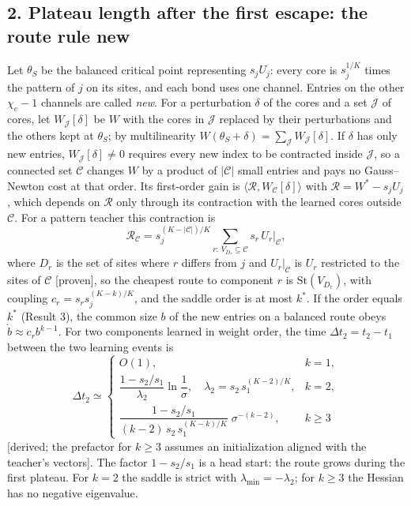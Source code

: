\documentclass[11pt]{article}
\newcommand{\NEW}{\colorbox{ForestGreen!22}{\textsf{\small new}}}
\newcommand{\ev}[1]{\textsf{\small[#1]}}
\newcommand{\St}{\mathrm{St}}
\begin{document}
\subsection*{2. Plateau length after the first escape: the route rule \hfill\NEW}
Let $\theta_S$ be the balanced critical point representing $s_jU_j$: every core is $s_j^{1/K}$ times the
pattern of $j$ on its sites, and each bond uses one channel. Entries on the other $\chi_e-1$ channels are
called \emph{new}. For a perturbation $\delta$ of the cores and a set $\mathcal J$ of cores, let $W_{\mathcal J}[\delta]$
be $W$ with the cores in $\mathcal J$ replaced by their perturbations and the others kept at $\theta_S$; by
multilinearity $W(\theta_S+\delta)=\sum_{\mathcal J}W_{\mathcal J}[\delta]$. If $\delta$ has only new entries,
$W_{\mathcal J}[\delta]\neq0$ requires every new index to be contracted inside $\mathcal J$, so a connected set
$\mathcal C$ changes $W$ by a product of $\lvert\mathcal C\rvert$ small entries and pays no Gauss--Newton cost at
that order. Its first-order gain is $\langle\mathcal R,W_{\mathcal C}[\delta]\rangle$ with $\mathcal R=W^*-s_jU_j$, which
depends on $\mathcal R$ only through its contraction with the learned cores outside $\mathcal C$. For a pattern
teacher this contraction is
\begin{equation}\label{eq:steiner}
\mathcal R_{\mathcal C}=s_j^{(K-\lvert\mathcal C\rvert)/K}\sum_{r:\,V_{D_r}\subseteq\mathcal C}s_r\,U_r\big|_{\mathcal C},
\end{equation}
where $D_r$ is the set of sites where $r$ differs from $j$ and $U_r|_{\mathcal C}$ is $U_r$ restricted to the
sites of $\mathcal C$ \ev{proven}, so the cheapest route to component $r$ is $\St(V_{D_r})$, with coupling
$c_r=s_r s_j^{(K-k)/K}$, and the saddle order is at most $k^*$. If the order equals $k^*$ (Result 3), the
common size $b$ of the new entries on a balanced route obeys $\dot b\approx c_r b^{k-1}$. For two components
learned in weight order, the time $\Delta t_2=t_2-t_1$ between the two learning events is
\begin{equation}\label{eq:route}
\Delta t_2\simeq
\begin{cases}
O(1), & k=1,\\[2pt]
\dfrac{1-s_2/s_1}{\lambda_2}\ln\dfrac1\sigma,\quad \lambda_2=s_2\,s_1^{(K-2)/K}, & k=2,\\[8pt]
\dfrac{1-s_2/s_1}{(k-2)\,s_2\,s_1^{(K-k)/K}}\;\sigma^{-(k-2)}, & k\ge3
\end{cases}
\end{equation}
\ev{derived; the prefactor for $k\ge3$ assumes an initialization aligned with the teacher's vectors}. The factor $1-s_2/s_1$ is a head
start: the route grows during the first plateau. For $k=2$ the saddle is strict with
$\lambda_{\min}=-\lambda_2$; for $k\ge3$ the Hessian has no negative eigenvalue.
\end{document}
